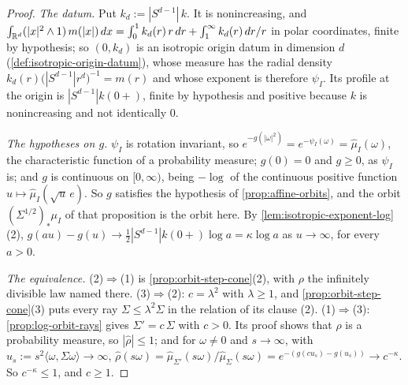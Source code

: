 \begin{proof}
\leanok
\emph{The datum.} Put $k_d := |S^{d-1}|\,k$. It is nonincreasing, and
$\int_{\mathbb{R}^d}(|x|^2 \wedge 1)\,m(|x|)\,dx = \int_0^1 k_d(r)\,r\,dr + \int_1^\infty k_d(r)\,dr/r$ in
polar coordinates, finite by hypothesis; so $(0,k_d)$ is an isotropic origin datum in dimension
$d$ (\ref{def:isotropic-origin-datum}), whose \Levy{} measure has the radial density
$k_d(r)\bigl(|S^{d-1}|r^d\bigr)^{-1} = m(r)$ and whose exponent is therefore $\psi_I$. Its profile at
the origin is $|S^{d-1}|k(0{+})$, finite by hypothesis and positive because $k$ is nonincreasing and
not identically $0$.

\emph{The hypotheses on $g$.} $\psi_I$ is rotation invariant, so $e^{-g(|\omega|^2)} =
e^{-\psi_I(\omega)} = \widehat\mu_I(\omega)$, the characteristic function of a probability measure;
$g(0) = 0$ and $g \ge 0$, as $\psi_I$ is; and $g$ is continuous on $[0,\infty)$, being $-\log$ of
the continuous positive function
$u \mapsto \widehat\mu_I(\sqrt u\,e)$. So $g$ satisfies the hypothesis of \ref{prop:affine-orbits}, and
the orbit $(\Sigma^{1/2})_*\mu_I$ of that proposition is the orbit here. By
\ref{lem:isotropic-exponent-log}(2), $g(au) - g(u) \to \tfrac12|S^{d-1}|k(0{+})\log a = \kappa\log a$
as $u \to \infty$, for every $a > 0$.

\emph{The equivalence.} (2)$\Rightarrow$(1) is \ref{prop:orbit-step-cone}(2), with $\rho$ the
infinitely divisible law named there. (3)$\Rightarrow$(2): $c = \lambda^2$ with $\lambda \ge 1$, and
\ref{prop:orbit-step-cone}(3) puts every ray $\Sigma \le \lambda^2\Sigma$ in the relation of its
clause (2). (1)$\Rightarrow$(3): \ref{prop:log-orbit-rays} gives $\Sigma' = c\,\Sigma$ with $c > 0$.
Its proof shows that $\rho$ is a probability measure, so $|\widehat\rho| \le 1$; and for
$\omega \ne 0$ and $s \to \infty$, with $u_s := s^2\langle\omega,\Sigma\omega\rangle \to \infty$,
$\widehat\rho(s\omega) = \widehat\mu_{\Sigma'}(s\omega)/\widehat\mu_\Sigma(s\omega) =
e^{-(g(cu_s) - g(u_s))} \to c^{-\kappa}$. So $c^{-\kappa} \le 1$, and $c \ge 1$.
\end{proof}

